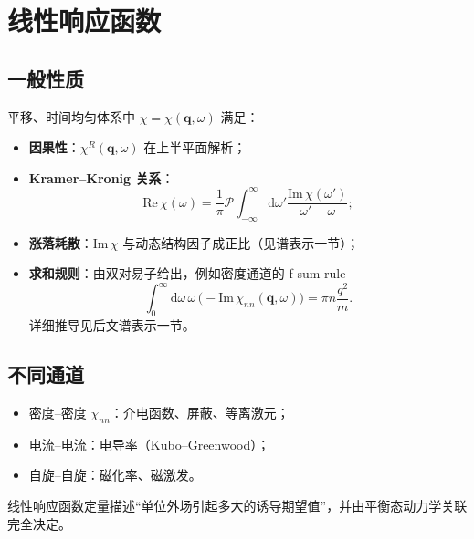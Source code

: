 \section{线性响应函数}

\subsection{一般性质}

平移、时间均匀体系中 $\chi=\chi(\mathbf{q},\omega)$ 满足：
\begin{itemize}
  \item \textbf{因果性}：$\chi^R(\mathbf{q},\omega)$ 在上半平面解析；
  \item \textbf{Kramer--Kronig 关系}：
  \begin{equation}
    \mathrm{Re}\,\chi(\omega)
    =\frac{1}{\pi}\mathcal{P}
    \int_{-\infty}^{\infty}
    \mathrm{d}\omega'
    \frac{\mathrm{Im}\,\chi(\omega')}{\omega'-\omega};
  \end{equation}
  \item \textbf{涨落耗散}：$\mathrm{Im}\,\chi$ 与动态结构因子成正比（见谱表示一节）；
  \item \textbf{求和规则}：由双对易子给出，例如密度通道的 f-sum rule
  \begin{equation}
    \int_0^{\infty}\mathrm{d}\omega\,
    \omega\,\bigl(-\mathrm{Im}\,\chi_{nn}(\mathbf{q},\omega)\bigr)
    =\pi n\frac{q^2}{m}.
  \end{equation}
  详细推导见后文谱表示一节。
\end{itemize}

\subsection{不同通道}

\begin{itemize}
  \item 密度--密度 $\chi_{nn}$：介电函数、屏蔽、等离激元；
  \item 电流--电流：电导率（Kubo--Greenwood）；
  \item 自旋--自旋：磁化率、磁激发。
\end{itemize}

\begin{definition}[广义极化率]
线性响应函数定量描述“单位外场引起多大的诱导期望值”，并由平衡态动力学关联完全决定。
\end{definition}
